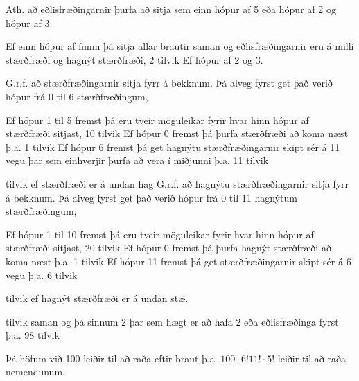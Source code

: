 Ath. að eðlisfræðingarnir þurfa að sitja sem einn hópur af 5 eða hópur af 2 og hópur af 3. 

\leftskip 15pt
\noindent Ef einn hópur af fimm þá sitja allar brautir saman og eðlisfræðingarnir eru á milli stærðfræði og hagnýt stærðfræði, 2 tilvik
\newline Ef hópur af 2 og 3.

\leftskip 30pt
\noindent G.r.f. að stærðfræðingarnir sitja fyrr á bekknum. Þá alveg fyrst get það verið hópur frá 0 til 6 stærðfræðingum,

\leftskip 45pt
\noindent Ef hópur 1 til 5 fremst þá eru tveir möguleikar fyrir hvar hinn hópur af stærðfræði sitjast, 10 tilvik
\newline Ef hópur 0 fremst þá þurfa stærðfræði að koma næst þ.a. 1 tilvik
\newline Ef hópur 6 fremst þá get hagnýtu stærðfræðingarnir skipt sér á 11 vegu þar sem einhverjir þurfa að vera í miðjunni þ.a. 11 tilvik

\leftskip 30pt
 tilvik ef stærðfræði er á undan hag
\newline G.r.f. að hagnýtu stærðfræðingarnir sitja fyrr á bekknum. Þá alveg fyrst get það verið hópur frá 0 til 11 hagnýtum stærðfræðingum,

\leftskip 45pt
\noindent Ef hópur 1 til 10 fremst þá eru tveir möguleikar fyrir hvar hinn hópur af stærðfræði sitjast, 20 tilvik
\newline Ef hópur 0 fremst þá þurfa hagnýt stærðfræði að koma næst þ.a. 1 tilvik
\newline Ef hópur 11 fremst þá get stærðfræðingarnir skipt sér á 6 vegu þ.a. 6 tilvik

\leftskip 30pt  tilvik ef hagnýt stærðfræði er á undan stæ.

\leftskip 15pt  tilvik saman og þá sinnum 2 þar sem hægt er að hafa 2 eða eðlisfræðinga fyrst þ.a. 98 tilvik

\leftskip 0pt\noindent Þá höfum við 100 leiðir til að raða eftir braut þ.a. $100\cdot 6!\dot11!\cdot5!$ leiðir til að raða nemendunum.

